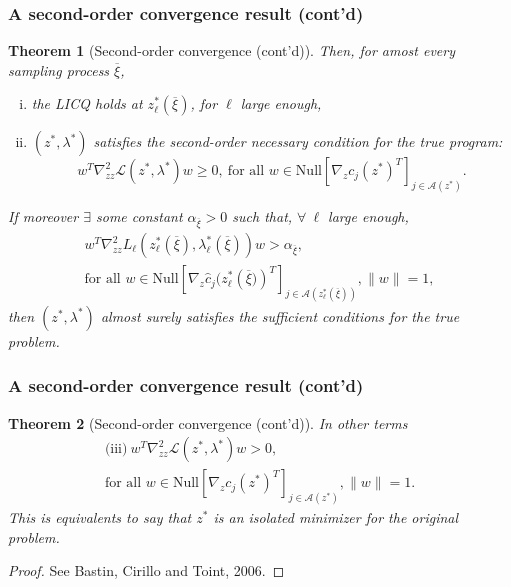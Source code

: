 \documentclass{beamer}
\newtheorem{theo}{Theorem}
\begin{document}
\begin{frame}
\frametitle{A second-order convergence result (cont'd)}
	
\begin{small}
\begin{theo}[Second-order convergence (cont'd)]
Then, for amost every sampling process $\overline{\xi}$,
\begin{enumerate}[(i)]
\item
the LICQ holds at $z^*_{\ell}( \overline{\xi} )$, for $\ell$ large enough,
\item
$( z^*, \lambda^* )$ satisfies the second-order necessary condition for the true program:
\[
w^T \nabla_{zz}^2 \mathcal{L} ( z^*, \lambda^* ) w \geq 0,\
\text{for all }w \in \text{Null}\left[\nabla_z c_j (z^* )^T \right]_{j
  \in \mathcal{A} ( z^*)}.
\]
\end{enumerate}
\noindent
If moreover $\exists$ some constant $\alpha_{\overline{\xi}} > 0$ such that, $\forall\ \ell$ large enough,
\begin{multline*}
w^T \nabla_{zz}^2 L_{\ell} \left(z^*_{\ell}(\overline{\xi}),
\lambda^*_{\ell}(\overline{\xi}) \right) w > \alpha_{\overline{\xi}},
\\\text{for all }w \in
\text{Null}\left[\nabla_z \hat{c}_j(z^*_{\ell} \left( \overline{\xi})
  \right)^T \right]_{j \in \mathcal{A} (z^*_{\ell}(\overline{\xi})) },
 \|w\|=1,
\end{multline*}
then $( z^*, \lambda^* )$ almost surely satisfies the sufficient conditions for the true problem.
\end{theo}
\end{small}

\end{frame}

\begin{frame}
\frametitle{A second-order convergence result (cont'd)}

\begin{theo}[Second-order convergence (cont'd)]
In other terms
\begin{multline*}
\text{(iii)}\ w^T \nabla_{zz}^2 \mathcal{L} ( z^*, \lambda^* )
w > 0,\\ \text{for all }w \in
\text{Null} \left[ \nabla_z c_j ( z^* )^T
  \right]_{j \in \mathcal{A} ( z^* )},
\|w\|=1.
\end{multline*}
This is equivalents to say that $z^*$ is an isolated minimizer for the original problem.
\end{theo}

\begin{proof}
See Bastin, Cirillo and Toint, 2006.
\end{proof}

\end{frame}
\end{document}
